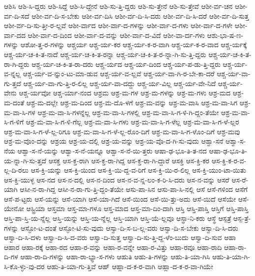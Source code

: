 {ಆಶಿಸಿ
ಆಶಿ-ಸಿ-ದ್ದರು
ಆಶಿ-ಸಿದ್ದೆ
ಆಶಿ-ಸಿ-ದ್ದೇನೆ
ಆಶಿ-ಸು-ತ್ತಿ-ದ್ದರು
ಆಶಿ-ಸು-ತ್ತೇನೆ
ಆಶಿ-ಸು-ತ್ತೇವೆ
ಆಶೀ-ರ್ವ-ಚನ
ಆಶೀ-ರ್ವ-ದಿ-ಸದೆ
ಆಶೀ-ರ್ವ-ದಿ-ಸ-ಬೇಕು
ಆಶೀ-ರ್ವ-ದಿಸಿ
ಆಶೀ-ರ್ವ-ದಿ-ಸಿ-ದರು
ಆಶೀ-ರ್ವ-ದಿ-ಸಿ-ದರೆ
ಆಶೀ-ರ್ವ-ದಿ-ಸುತ್ತ
ಆಶೀ-ರ್ವ-ದಿ-ಸು-ತ್ತೀ-ರ-ಲ್ಲವೆ
ಆಶೀ-ರ್ವಾದ
ಆಶೀ-ರ್ವಾ-ದ-ಗಳನ್ನು
ಆಶೀ-ರ್ವಾ-ದ-ಗಳು
ಆಶೀ-ರ್ವಾ-ದ-ಗಳೇ
ಆಶೀ-ರ್ವಾ-ದದ
ಆಶೀ-ರ್ವಾ-ದ-ದಿಂದ
ಆಶೀ-ರ್ವಾ-ದ-ವನ್ನು
ಆಶೀ-ರ್ವಾ-ದ-ವಿದೆ
ಆಶೀ-ವಾ-ರ್ದ-ಗಳು
ಆಶು-ಭಾ-ಷ-ಣ-ಗಳನ್ನು
ಆಶೋ-ತ್ತ-ರ-ಗಳನ್ನು
ಆಶ್ಚರ್ಯ
ಆಶ್ಚ-ರ್ಯ-ಕರ
ಆಶ್ಚ-ರ್ಯ-ಕ-ರ-ವಾಗಿ
ಆಶ್ಚ-ರ್ಯ-ಕ-ರ-ವಾದ
ಆಶ್ಚ-ರ್ಯಕ್ಕೆ
ಆಶ್ಚ-ರ್ಯ-ಚ-ಕಿ-ತ-ನಾದೆ
ಆಶ್ಚ-ರ್ಯ-ಚ-ಕಿ-ತ-ರನ್ನಾ
ಆಶ್ಚ-ರ್ಯ-ಚ-ಕಿ-ತ-ರ-ನ್ನಾ-ಗಿ-ಸು-ತ್ತಿ-ದ್ದರು
ಆಶ್ಚ-ರ್ಯ-ಚ-ಕಿ-ತ-ರಾ-ಗಿ-ದ್ದರು
ಆಶ್ಚ-ರ್ಯ-ಚ-ಕಿ-ತ-ರಾ-ದರು
ಆಶ್ಚ-ರ್ಯದ
ಆಶ್ಚ-ರ್ಯ-ದಿಂದ
ಆಶ್ಚ-ರ್ಯ-ಪ-ಡು-ತ್ತಿ-ದ್ದರು
ಆಶ್ಚ-ರ್ಯ-ವ-ನ್ನಲ್ಲ
ಆಶ್ಚ-ರ್ಯ-ವ-ನ್ನುಂ-ಟು-ಮಾ-ಡುವ
ಆಶ್ಚ-ರ್ಯ-ವ-ಲ್ಲವೆ
ಆಶ್ಚ-ರ್ಯ-ವಾ-ಗಿ-ರ-ಬೇ-ಕಾ-ದರೆ
ಆಶ್ಚ-ರ್ಯ-ವಾ-ಗು-ತ್ತದೆ
ಆಶ್ಚ-ರ್ಯ-ವಾ-ಗು-ತ್ತಿ-ರ-ಲಿಲ್ಲ
ಆಶ್ಚ-ರ್ಯ-ವಾ-ದದ್ದು
ಆಶ್ಚ-ರ್ಯ-ವಿಲ್ಲ
ಆಶ್ಚ-ರ್ಯ-ವೇ-ನಿದೆ
ಆಶ್ಚ-ರ್ಯ-ವೇನು
ಆಶ್ಚ-ರ್ಯವೋ
ಆಶ್ಚ-ರ್ಯಾ-ನಂದ
ಆಶ್ರಮ
ಆಶ್ರ-ಮ-ಗಳ
ಆಶ್ರ-ಮ-ಗಳನ್ನು
ಆಶ್ರ-ಮ-ಗಳು
ಆಶ್ರ-ಮದ
ಆಶ್ರ-ಮ-ದಂತೆ
ಆಶ್ರ-ಮ-ದಲ್ಲೇ
ಆಶ್ರ-ಮ-ದಿಂದ
ಆಶ್ರ-ಮ-ದೊ-ಳಗೆ
ಆಶ್ರ-ಮ-ವನ್ನು
ಆಶ್ರ-ಮ-ವಾಸಿ
ಆಶ್ರ-ಮ-ವಾ-ಸಿಗ
ಆಶ್ರ-ಮ-ವಾ-ಸಿ-ಗಳ
ಆಶ್ರ-ಮ-ವಾ-ಸಿ-ಗಳನ್ನೆಲ್ಲ
ಆಶ್ರ-ಮ-ವಾ-ಸಿ-ಗಳಲ್ಲಿ
ಆಶ್ರ-ಮ-ವಾ-ಸಿ-ಗ-ಳಿ-ಗಿ-ದ್ದಂ-ತೆಯೇ
ಆಶ್ರ-ಮ-ವಾ-ಸಿ-ಗ-ಳಿಗೆ
ಆಶ್ರ-ಮ-ವಾ-ಸಿ-ಗ-ಳಿ-ಗೆಲ್ಲ
ಆಶ್ರ-ಮ-ವಾ-ಸಿ-ಗಳು
ಆಶ್ರ-ಮ-ವಾ-ಸಿ-ಗ-ಳೆಲ್ಲ
ಆಶ್ರ-ಮ-ವಾ-ಸಿ-ಗ-ಳೆ-ಲ್ಲರ
ಆಶ್ರ-ಮ-ವಾ-ಸಿ-ಗ-ಳೆ-ಲ್ಲ-ರಿಗೂ
ಆಶ್ರ-ಮ-ವಾ-ಸಿ-ಗ-ಳೆ-ಲ್ಲ-ರೊಂ-ದಿಗೆ
ಆಶ್ರ-ಮ-ವಾ-ಸಿ-ಗ-ಳೊಂ-ದಿಗೆ
ಆಶ್ರ-ಮವು
ಆಶ್ರ-ಮ-ವೊಂ-ದನ್ನು
ಆಶ್ರಯ
ಆಶ್ರ-ಯ-ದಲ್ಲಿ
ಆಶ್ರ-ಯ-ವನ್ನು
ಆಶ್ರ-ಯ-ವೊ-ದ-ಗಿ-ಸು-ವುದು
ಆಶ್ವಾ-ಸನೆ
ಆಶ್ವಾ-ಸ-ನೆಯ
ಆಶ್ವಾ-ಸ-ನೆ-ಯನ್ನು
ಆಶ್ವಾ-ಸ-ನೆ-ಯನ್ನೂ
ಆಶ್ವಾ-ಸ-ನೆ-ಯಿ-ತ್ತರು
ಆಷಾ-ಢ-ಭೂ-ತಿ-ತ-ನದ
ಆಷಾ-ಢ-ಭೂ-ತಿ-ಯ-ನ್ನಾ-ಗಿ-ಸು-ತ್ತದೆ
ಆಸಕ್ತ
ಆಸ-ಕ್ತ-ರಾಗಿ
ಆಸ-ಕ್ತ-ರಾ-ಗಿದ್ದ
ಆಸ-ಕ್ತ-ರಾ-ಗಿ-ದ್ದಾರೆ
ಆಸಕ್ತಿ
ಆಸ-ಕ್ತಿ-ಕರ
ಆಸ-ಕ್ತಿ-ಕ-ರ-ವ-ಲ್ಲ-ದಿ-ರಲು
ಆಸ-ಕ್ತಿ-ಯನ್ನು
ಆಸ-ಕ್ತಿ-ಯಿಂದ
ಆಸ-ಕ್ತಿ-ಯಿ-ದ್ದ-ವ-ರಿಗೆ
ಆಸ-ಕ್ತಿ-ಯಿ-ರ-ಲಿಲ್ಲ
ಆಸ-ಕ್ತಿ-ಯುಂ-ಟಾ-ಯಿತು
ಆಸ-ಕ್ತಿ-ಯುಳ್ಳ
ಆಸ-ನದ
ಆಸ-ನ-ದಲ್ಲಿ
ಆಸ-ನ-ದಿಂದ
ಆಸ-ನ-ವ-ನ್ನ-ಲಂ-ಕ-ರಿ-ಸಿ-ದರು
ಆಸ-ನ-ವನ್ನು
ಆಸರೆ
ಆಸ-ರೆ-ಯಾಗಿ
ಆಸೀ-ನ-ರಾ-ಗಿದ್ದ
ಆಸೀ-ನ-ರಾ-ಗು-ತ್ತಿ-ದ್ದಂ-ತೆಯೇ
ಆಸು-ಪಾ-ಸಿನ
ಆಸು-ಪಾ-ಸಿ-ನಲ್ಲಿ
ಆಸೆ
ಆಸೆ-ಗಳಿಂದ
ಆಸೆಗೆ
ಆಸೆ-ಪ-ಟ್ಟರು
ಆಸೆ-ಯನ್ನು
ಆಸೆ-ಯಾಗಿ
ಆಸೆ-ಯಾ-ಗಿದೆ
ಆಸೆ-ಯಿಂದ
ಆಸೆ-ಯಿ-ತ್ತು-ಅದು
ಆಸೆ-ಯಿದೆ
ಆಸೆಯೇ
ಆಸೆ-ಯೇನೋ
ಆಸ್ಟ್ರಿಯಾ
ಆಸ್ತಮಾ
ಆಸ್ತ-ಮಾ-ಗಳೂ
ಆಸ್ತ-ಮಾದ
ಆಸ್ತ-ಮಾ-ದಿಂ-ದಾಗಿ
ಆಸ್ತಿ
ಆಸ್ತಿ-ಪಾಸ್ತಿ
ಆಸ್ತಿಗೆ
ಆಸ್ತಿ-ಪಾಸ್ತಿ
ಆಸ್ತಿ-ಪಾ-ಸ್ತಿ-ಯ-ನ್ನೆಲ್ಲ
ಆಸ್ತಿ-ಯನ್ನು
ಆಸ್ತಿ-ಯ-ನ್ನೆಲ್ಲ
ಆಸ್ತಿ-ಯಾಗಿ
ಆಸ್ತಿ-ಯೆ-ಲ್ಲವೂ
ಆಸ್ಥಾ-ನಿ-ಕರು
ಆಸ್ಥೆ
ಆಸ್ಪತ್ರೆ
ಆಸ್ಪ-ತ್ರೆ-ಗಳನ್ನು
ಆಸ್ಫೋ-ಟ-ದಂತೆ
ಆಸ್ಫೋ-ಟಿ-ಸು-ವುದು
ಆಸ್ವಾ-ದಿ-ಸ-ಬ-ಲ್ಲ-ವರು
ಆಸ್ವಾ-ದಿ-ಸ-ಬೇಕು
ಆಸ್ವಾ-ದಿ-ಸಿ-ದರು
ಆಸ್ವಾ-ದಿ-ಸಿ-ದಳು
ಆಸ್ವಾ-ದಿ-ಸಿ-ದ-ವರು
ಆಸ್ವಾ-ದಿ-ಸುತ್ತ
ಆಸ್ವಾ-ದಿ-ಸು-ತ್ತಿ-ದ್ದ-ಳೆಂ-ಬುದು
ಆಸ್ವಾ-ದಿ-ಸುವ
ಆಹಾ
ಆಹಾರ
ಆಹಾ-ರಕ್ಕೆ
ಆಹಾ-ರದ
ಆಹಾ-ರ-ವನ್ನು
ಆಹಾ-ರ-ವನ್ನೇ
ಆಹಾ-ರ-ವಿತ್ತು
ಆಹಾ-ರವೂ
ಆಹಾ-ರಾದಿ
ಆಹಾ-ರಾ-ದಿ-ಗಳ
ಆಹಾ-ರಾ-ದಿ-ಗಳನ್ನು
ಆಹಾ-ರಾ-ಭ್ಯಾ-ಸ-ಗಳು
ಆಹುತಿ
ಆಹು-ತಿ-ಗಳನ್ನು
ಆಹು-ತಿ-ಯಾ-ಗಿಸಿ
ಆಹು-ತಿ-ಯಾ-ಗಿ-ಸಿ-ಕೊ-ಳ್ಳು-ವು-ದರ
ಆಹು-ತಿ-ಯಾ-ಗು-ತ್ತಿವೆ
ಆಹ್
ಆಹ್ಲಾ-ದ-ಕ-ರ-ವಾಗಿ
ಆಹ್ಲಾ-ದ-ಕ-ರ-ವಾ-ಗಿಯೇ
}
